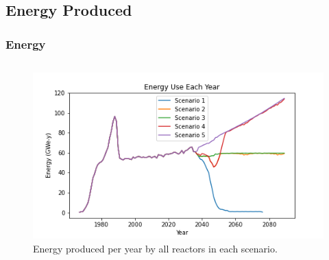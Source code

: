 \subsection{Energy Produced}
\begin{frame}
    \frametitle{Energy}
    \begin{columns}
        \column[t]{5cm}

        \column[t]{5cm}
        \begin{figure}
            \centering 
            \includegraphics[scale=0.3]{figures/energy_scenarios_all.png}
            \caption{Energy produced per year by all reactors in each scenario.}
            \label{fig:energy}
        \end{figure}
    \end{columns}
\end{frame}

